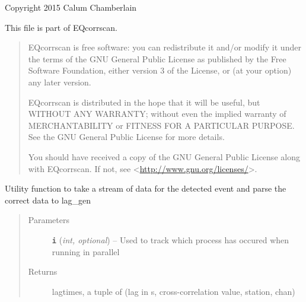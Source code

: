\documentclass[a4paper,10pt,english]{sphinxmanual}
\begin{document}
Copyright 2015 Calum Chamberlain

This file is part of EQcorrscan.
\begin{quote}

EQcorrscan is free software: you can redistribute it and/or modify
it under the terms of the GNU General Public License as published by
the Free Software Foundation, either version 3 of the License, or
(at your option) any later version.

EQcorrscan is distributed in the hope that it will be useful,
but WITHOUT ANY WARRANTY; without even the implied warranty of
MERCHANTABILITY or FITNESS FOR A PARTICULAR PURPOSE.  See the
GNU General Public License for more details.

You should have received a copy of the GNU General Public License
along with EQcorrscan.  If not, see \textless{}\href{http://www.gnu.org/licenses/}{http://www.gnu.org/licenses/}\textgreater{}.
\end{quote}

\begin{fulllineitems}
\label{core:lag_calc._channel_loop}
Utility function to take a stream of data for the detected event and parse
the correct data to lag\_gen
\begin{quote}\begin{description}
\item[{Parameters}] \leavevmode
\textbf{\texttt{i}} (\emph{int, optional}) -- Used to track which process has occured when running in parallel

\item[{Returns}] \leavevmode
lagtimes, a tuple of (lag in s, cross-correlation value, station, chan)

\end{description}\end{quote}

\end{fulllineitems}

\end{document}
